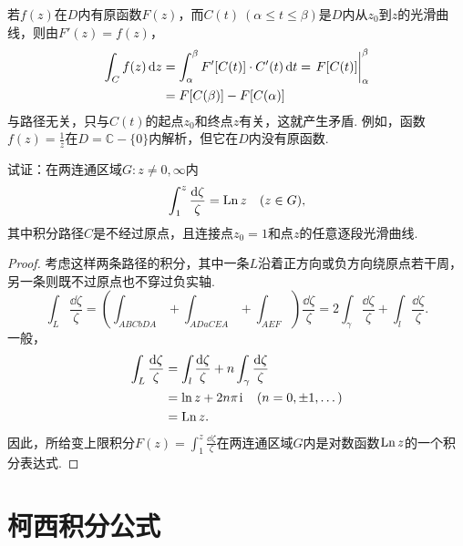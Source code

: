 若\(f(z)\)在\(D\)内有原函数\(F(z)\)，而\(C(t)\ (\alpha\leqslant t \leqslant\beta)\)是\(D\)内从\(z_0\)到\(z\)的光滑曲线，则由\(F'(z) = f(z)\)，\begin{align*}
\int_C f(z) \dd{z}
&= \int_{\alpha}^{\beta} F'[C(t)] \cdot C'(t) \dd{t}
= \eval{F[C(t)]}_{\alpha}^{\beta} \\
&= F[C(\beta)] - F[C(\alpha)]
\end{align*}
与路径无关，只与\(C(t)\)的起点\(z_0\)和终点\(z\)有关，这就产生矛盾.
例如，函数\(f(z) = \frac{1}{z}\)在\(D=\mathbb{C}-\{0\}\)内解析，但它在\(D\)内没有原函数.
\begin{example}%
\def\f{\frac{\dd{\zeta}}{\zeta}}
试证：在两连通区域\(G: z\neq0,\infty\)内\[
\int_1^z \f
= \Ln z
\quad (z \in G),
\]其中积分路径\(C\)是不经过原点，且连接点\(z_0=1\)和点\(z\)的任意逐段光滑曲线.
\begin{proof}
考虑这样两条路径的积分，其中一条\(L\)沿着正方向或负方向绕原点若干周，另一条则既不过原点也不穿过负实轴.
\[
\int_L \f
= \left(\int_{ABCbDA} + \int_{ADaCEA} + \int_{AEF}\right) \f
= 2 \int_{\gamma} \f + \int_l \f.
\]
一般，\begin{align*}
\int_L \f
&= \int_l \f + n \int_{\gamma} \f \\
&= \ln z + 2n\pi\iu \quad(n=0,\pm1,\dotsc) \\
&= \Ln z.
\end{align*}
因此，所给变上限积分\(F(z) = \int_1^z \f\)在两连通区域\(G\)内是对数函数\(\operatorname{Ln} z\)的一个积分表达式.
\end{proof}
\end{example}

\section{柯西积分公式}
